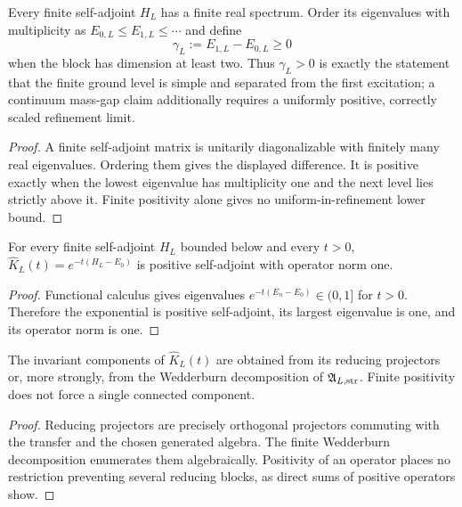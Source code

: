 \documentclass[12pt,a4paper]{article}
\begin{document}
\begin{theorem}
\label{p10:thm:finite-spectral-discreteness}
Every finite self-adjoint \(H_L\) has a finite real spectrum.  Order its eigenvalues with multiplicity as \(E_{0,L}\le E_{1,L}\le\cdots\) and define
\begin{equation}
\label{p10:eq:finite-gap-functional}
\gamma_L:=E_{1,L}-E_{0,L}\ge0
\end{equation}
when the block has dimension at least two.  Thus \(\gamma_L>0\) is exactly the statement that the finite ground level is simple and separated from the first excitation; a continuum mass-gap claim additionally requires a uniformly positive, correctly scaled refinement limit.
\end{theorem}
\begin{proof}
A finite self-adjoint matrix is unitarily diagonalizable with finitely many real eigenvalues.  Ordering them gives the displayed difference.  It is positive exactly when the lowest eigenvalue has multiplicity one and the next level lies strictly above it.  Finite positivity alone gives no uniform-in-refinement lower bound.
\end{proof}

\begin{theorem}
\label{p10:thm:reflection-positive-transfer-representative}
For every finite self-adjoint \(H_L\) bounded below and every \(t>0\), \(\widehat K_L(t)=e^{-t(H_L-E_0)}\) is positive self-adjoint with operator norm one.
\end{theorem}
\begin{proof}
Functional calculus gives eigenvalues $e^{-t(E_n-E_0)}\in(0,1]$ for $t>0$.  Therefore the exponential is positive self-adjoint, its largest eigenvalue is one, and its operator norm is one.
\end{proof}

\begin{theorem}
\label{p10:thm:finite-heat-kernel-gap}
The invariant components of \(\widehat K_L(t)\) are obtained from its reducing projectors or, more strongly, from the Wedderburn decomposition of \(\mathfrak A_{L,{\rm str}}\).  Finite positivity does not force a single connected component.
\end{theorem}
\begin{proof}
Reducing projectors are precisely orthogonal projectors commuting with the transfer and the chosen generated algebra.  The finite Wedderburn decomposition enumerates them algebraically.  Positivity of an operator places no restriction preventing several reducing blocks, as direct sums of positive operators show.
\end{proof}
\end{document}
